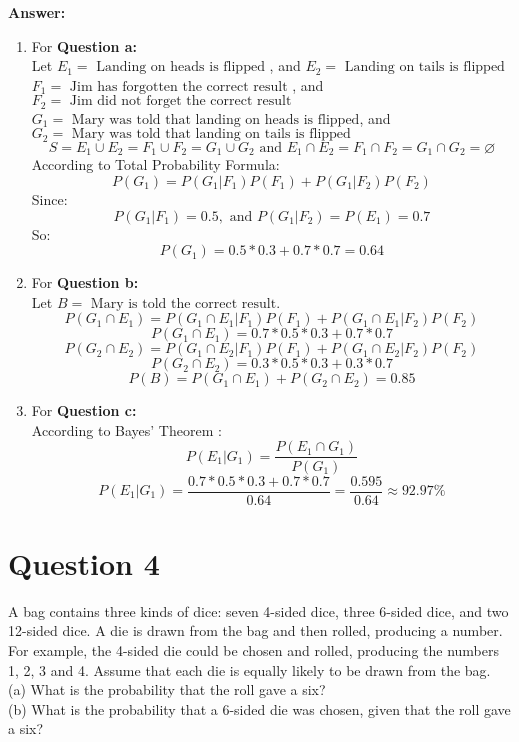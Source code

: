 \documentclass[hidelinks]{article}
\begin{document}
\textbf{\large Answer:}
\begin{enumerate}
    \item For \textbf{Question a:}\\
    Let $ E_1 = \text{ Landing on heads is flipped }$, and $ E_2 = \text{ Landing on tails is flipped}$\\
    $ F_1 = \text{ Jim has forgotten the correct result } $, and $ F_2 = \text{ Jim did not forget the correct result } $\\
    $ G_1 = \text{ Mary was told that landing on heads is flipped} $, and $ G_2 = \text{ Mary was told that landing on tails is flipped } $
    $$ S = E_1 \cup E_2 = F_1 \cup F_2 = G_1 \cup G_2 \text{ and } E_1 \cap E_2 = F_1 \cap F_2 = G_1 \cap G_2 = \varnothing$$
    According to Total Probability Formula:
    $$ P(G_1) = P(G_1|F_1)P(F_1) + P(G_1|F_2)P(F_2)$$
    Since:
    $$ P(G_1|F_1) = 0.5,\text{ and } P(G_1|F_2) = P(E_1) = 0.7$$
    So:
    $$ P(G_1) = 0.5 * 0.3 + 0.7 * 0.7 = 0.64$$
    \item For \textbf{Question b:}\\
    Let $ B = \text{ Mary is told the correct result. }$
    $$ P(G_1 \cap E_1)  =  P(G_1 \cap E_1|F_1)P(F_1) + P(G_1 \cap E_1|F_2)P(F_2) $$
    $$ P(G_1 \cap E_1) = 0.7*0.5*0.3 + 0.7 * 0.7 $$
    $$ P(G_2 \cap E_2)  =  P(G_1 \cap E_2|F_1)P(F_1) + P(G_1 \cap E_2|F_2)P(F_2) $$
    $$ P(G_2 \cap E_2) = 0.3*0.5*0.3 + 0.3 * 0.7 $$
    $$ P(B) = P(G_1 \cap E_1) + P(G_2 \cap E_2) = 0.85$$
    
    \item For \textbf{Question c:}\\
    According to Bayes' Theorem :
    $$ P(E_1|G_1) = \frac{P( E_1 \cap G_1) }{P(G_1)} $$
    $$ P(E_1|G_1) = \frac{0.7*0.5*0.3 + 0.7*0.7}{0.64} = \frac{0.595}{0.64} \approx 92.97\% $$
\end{enumerate}
\section{Question 4}
A bag contains three kinds of dice: seven 4-sided dice, three 6-sided dice, and two
12-sided dice. A die is drawn from the bag and then rolled, producing a number. For
example, the 4-sided die could be chosen and rolled, producing the numbers 1, 2, 3 and 4. Assume that each die is equally likely to be drawn from the bag.\\
(a) What is the probability that the roll gave a six?\\
(b) What is the probability that a 6-sided die was chosen, given that the roll gave a six?
\end{document}
